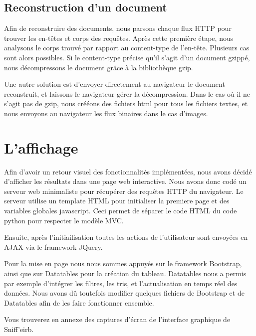 \subsection{Reconstruction d'un document}

Afin de reconstruire des documents, nous parsons chaque flux HTTP pour trouver les en-têtes et corps des requêtes. Après cette première étape, nous analysons le corps trouvé par rapport au content-type de l'en-tête.
Plusieurs cas sont alors possibles. Si le content-type précise qu'il s'agit d'un document gzippé, nous décompressons le document grâce à la bibliothèque gzip. 

Une autre solution est d'envoyer directement au navigateur le document reconstruit, et laissons le navigateur gérer la décompression.
Dans le cas où il ne s'agit pas de gzip, nous crééons des fichiers html pour tous les fichiers textes, et nous envoyons au navigateur les flux binaires dans le cas d'images.



\section{L'affichage}
Afin d'avoir un retour visuel des fonctionnalités implémentées, nous avons décidé d'afficher les résultats dans une page web interactive. 
Nous avons donc codé un serveur web minimaliste pour récupérer des requêtes HTTP du navigateur. Le serveur utilise un template HTML pour
initialiser la premiere page et des variables globales javascript. Ceci permet de séparer le code HTML du code python pour respecter le modèle MVC.

Ensuite, après l'initiailisation toutes les actions de l'utilisateur sont envoyées en AJAX via le framework JQuery.

Pour la mise en page nous nous sommes appuyés sur le framework Bootstrap, ainsi que sur Datatables pour la création du tableau. Datatables nous a
permis par exemple d'intégrer les filtres, les tris, et l'actualisation en temps réel des données. 
Nous avons dû toutefois modifier quelques fichiers de Bootstrap et de Datatables afin de les faire fonctionner ensemble.


Vous trouverez en annexe des captures d'écran de l'interface graphique de Sniff'eirb.

